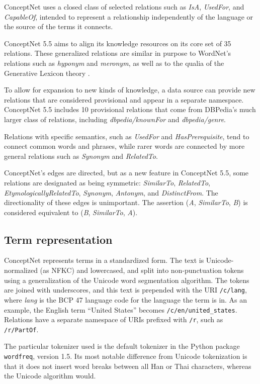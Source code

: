 \documentclass[letterpaper]{article}
\begin{document}
ConceptNet uses a closed class of selected relations such as \emph{IsA},
\emph{UsedFor}, and \emph{CapableOf}, intended to
represent a relationship independently of the language or the source of
the terms it connects.

ConceptNet 5.5 aims to align its knowledge resources on its core set of 35
relations. These generalized relations are similar in purpose to WordNet's
relations such as \emph{hyponym} and \emph{meronym}, as well as to the qualia
of the Generative Lexicon theory \cite{pustejovsky1991generative}.

To allow for expansion to new kinds of knowledge, a data
source can provide new relations that are considered provisional and
appear in a separate namespace. ConceptNet 5.5 includes 10 provisional
relations that come from DBPedia's much larger class of relations,
including \emph{dbpedia/knownFor} and \emph{dbpedia/genre}.

Relations with specific semantics, such as \emph{UsedFor} and
\emph{HasPrerequisite}, tend to connect common words and phrases, while
rarer words are connected by more general relations such as
\emph{Synonym} and \emph{RelatedTo}.

ConceptNet's edges are directed, but as a new feature in ConceptNet 5.5,
some relations are designated as being symmetric: \emph{SimilarTo},
\emph{RelatedTo}, \emph{EtymologicallyRelatedTo}, \emph{Synonym},
\emph{Antonym}, and \emph{DistinctFrom}. The directionality of these
edges is unimportant. The assertion (\emph{A}, \emph{SimilarTo},
\emph{B}) is considered equivalent to (\emph{B}, \emph{SimilarTo},
\emph{A}).


\subsection{Term representation}\label{term-representation}

ConceptNet represents terms in a standardized form. The text is
Unicode-normalized (as NFKC) and lowercased, and split into
non-punctuation tokens using a generalization of the Unicode word
segmentation algorithm. The tokens are joined with underscores, and this
text is prepended with the URI \texttt{/c/lang}, where \emph{lang} is
the BCP 47 language code for the language the term is in. As an example,
the English term ``United States'' becomes
\texttt{/c/en/united\_states}. Relations have a separate namespace of
URIs prefixed with \texttt{/r}, such as \texttt{/r/PartOf}.

The particular tokenizer used is the default tokenizer in the Python
package \texttt{wordfreq}, version 1.5. Its most notable difference from
Unicode tokenization is that it does not insert word breaks between all
Han or Thai characters, whereas the Unicode algorithm would.
\end{document}
